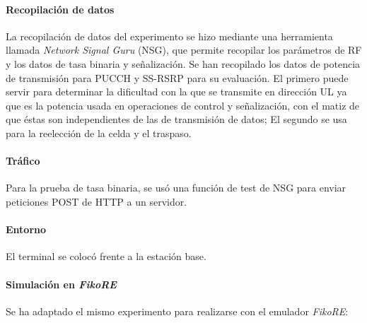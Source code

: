 \documentclass[12pt]{report} %
\begin{document}
\paragraph{Recopilación de datos}

La recopilación de datos del experimento se hizo mediante una herramienta llamada \textit{Network Signal Guru} (NSG),
que permite recopilar los parámetros de RF y los datos de tasa binaria y señalización.
Se han recopilado los datos de potencia de transmisión para PUCCH y SS-RSRP para su evaluación.
El primero puede servir para determinar la dificultad con la que se transmite en dirección UL ya que es la potencia usada en operaciones de control y señalización,
con el matiz de que éstas son independientes de las de transmisión de datos;
El segundo se usa para la reelección de la celda y el traspaso.

\paragraph{Tráfico}

Para la prueba de tasa binaria, se usó una función de test de NSG para enviar peticiones POST de HTTP a un servidor.

\paragraph{Entorno}

El terminal se colocó frente a la estación base.

\paragraph{Simulación en \textit{FikoRE}}

Se ha adaptado el mismo experimento para realizarse con el emulador \textit{FikoRE}:
\end{document}
